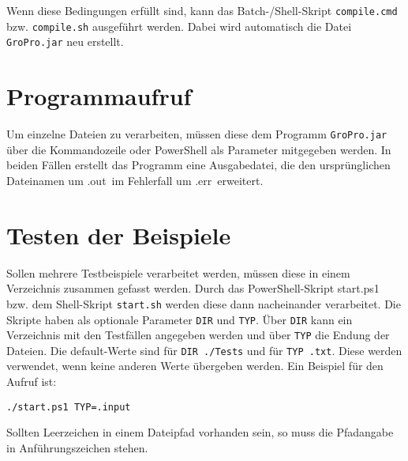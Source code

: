 Wenn diese Bedingungen erfüllt sind, kann das Batch-/Shell-Skript \lstinline{compile.cmd} bzw. \lstinline{compile.sh} ausgeführt werden. Dabei wird automatisch die Datei \lstinline{GroPro.jar} neu erstellt.

\clearpage
\section{Programmaufruf}
\label{sec:Programmaufruf}
Um einzelne Dateien zu verarbeiten, müssen diese dem Programm \lstinline{GroPro.jar} über die Kommandozeile oder PowerShell als Parameter mitgegeben werden. In beiden Fällen erstellt das Programm eine Ausgabedatei, die den ursprünglichen Dateinamen um \glqq .out\grqq\ im Fehlerfall um \glqq .err\grqq\ erweitert.

\section{Testen der Beispiele}
Sollen mehrere Testbeispiele verarbeitet werden, müssen diese in einem Verzeichnis zusammen gefasst werden. Durch das PowerShell-Skript {start.ps1} bzw. dem Shell-Skript \lstinline{start.sh} werden diese dann nacheinander verarbeitet. Die Skripte haben als optionale Parameter \lstinline{DIR} und \lstinline{TYP}. Über \lstinline{DIR} kann ein Verzeichnis mit den Testfällen angegeben werden und über \lstinline{TYP} die Endung der Dateien. Die default-Werte sind für \lstinline{DIR ./Tests} und für \lstinline{TYP .txt}. Diese werden verwendet, wenn keine anderen Werte übergeben werden. Ein Beispiel für den Aufruf ist:

\lstinline{./start.ps1 TYP=.input}

Sollten Leerzeichen in einem Dateipfad vorhanden sein, so muss die Pfadangabe in Anführungszeichen stehen.

